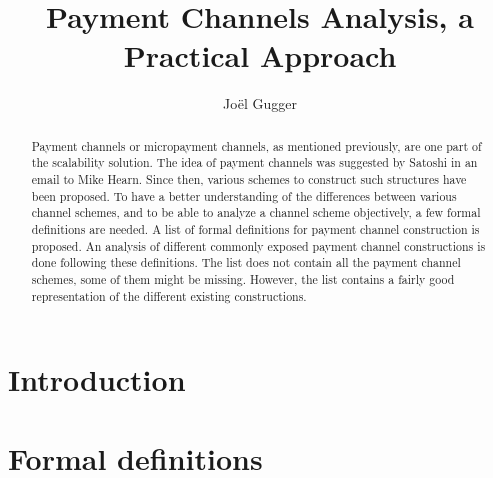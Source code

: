 \documentclass{llncs}
\begin{document}
\title{Payment Channels Analysis, a Practical Approach}
\author{Jo\"el Gugger}

\maketitle

\begin{abstract} Payment channels or micropayment channels, as mentioned previously, are one part of the scalability solution. The idea of payment channels was suggested by Satoshi in an email to Mike Hearn. Since then, various schemes to construct such structures have been proposed. To have a better understanding of the differences between various channel schemes, and to be able to analyze a channel scheme objectively, a few formal definitions are needed. A list of formal definitions for payment channel construction is proposed. An analysis of different commonly exposed payment channel constructions is done following these definitions. The list does not contain all the payment channel schemes, some of them might be missing. However, the list contains a fairly good representation of the different existing constructions.
\end{abstract}

\section{Introduction}

\section{Formal definitions}
\end{document}
